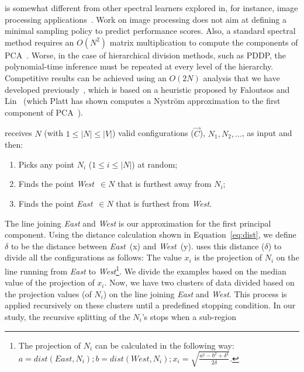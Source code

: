 \what is somewhat different from other spectral
learners explored in, for instance, image processing applications~\cite{shi00}.
Work on image processing does not aim at
defining a minimal sampling policy to predict performance scores.
Also, a standard spectral method requires an $O(N^2)$ matrix multiplication to compute the components
of PCA~\cite{ilin10}. Worse, in the case of hierarchical division methods, such as PDDP,
the polynomial-time inference must be repeated at every level of the hierarchy.
Competitive results can be achieved
using an $O(2N)$ analysis that we have developed previously~\cite{me12d}, which is  based on  a heuristic proposed by Faloutsos and Lin~\cite{Faloutsos1995} (which Platt has shown computes a Nystr\"om approximation to the first component of PCA~\cite{platt05}).

\what receives $N$ (with $1\leq \left\vert{N}\right\vert\leq \left\vert{V}\right\vert$)
valid configurations ($\vec{C}$), $N_1,N_2,...$, as input and then:
\begin{enumerate}
\item
Picks any
point $N_i$ ($1\leq i \leq\left\vert{N}\right\vert$) at random;
\item
Finds
 the point  {\em West}~$\in N$ that is
furthest away from $N_i$;
\item Finds the point {\em East}~$\in N$
that is furthest from {\em West}.
\end{enumerate}
The line joining {\em East}
and {\em West} is our approximation for the first principal component.
Using the distance calculation shown in Equation~\ref{eq:dist}, 
we define $\delta$ to be the distance between {\em East}~(x)
and {\em West}~(y). 
\what uses this distance ($\delta$) to divide all the configurations as follows:
The value $x_i$ is the projection of $N_i$
on the line  running  from {\em East} to {\em West}\footnote{The projection of $N_i$ can be calculated in the following way:\newline $a = \mathit{dist}(\mathit{East}, N_i); b = \mathit{dist}(\mathit{West}, N_i);  x_i = \sqrt{\frac{a^2 - b^2 + \delta^2}{2\delta}}$.
}.  We divide
the examples based on the median value of the projection of $x_i$. Now, we have two clusters of data divided based on the projection values (of $N_i$) on the line joining {\em East} and {\em West}. This process is applied recursively on these clusters until a predefined stopping condition. In our study, the  recursive splitting of the $N_i$'s stops when a sub-region
